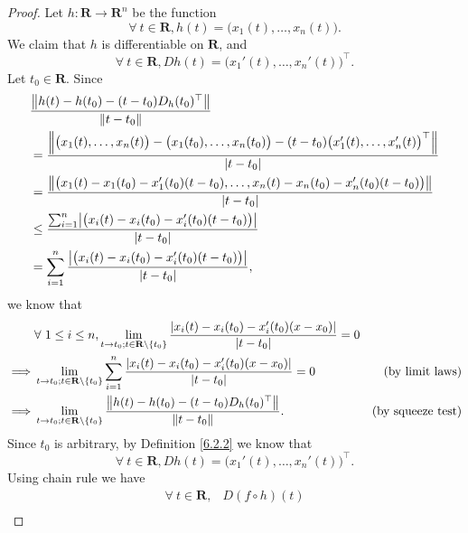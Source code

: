 \begin{proof}
    Let \(h : \mathbf{R} \to \mathbf{R}^n\) be the function
    \[
        \forall\ t \in \mathbf{R}, h(t) = \big(x_1(t), \dots, x_n(t)\big).
    \]
    We claim that \(h\) is differentiable on \(\mathbf{R}\), and
    \[
        \forall\ t \in \mathbf{R}, D h(t) = \big(x_1'(t), \dots, x_n'(t)\big)^\top.
    \]
    Let \(t_0 \in \mathbf{R}\).
    Since
    \begin{align*}
         & \frac{\norm*{h(t) - h(t_0) - (t - t_0) D_h(t_0)^\top}}{\norm*{t - t_0}}                                                                                   \\
         & = \frac{\norm*{\big(x_1(t), \dots, x_n(t)\big) - \big(x_1(t_0), \dots, x_n(t_0)\big) - (t - t_0) \big(x_1'(t), \dots, x_n'(t)\big)^\top}}{\abs*{t - t_0}} \\
         & = \frac{\norm*{\big(x_1(t) - x_1(t_0) - x_1'(t_0)(t - t_0), \dots, x_n(t) - x_n(t_0) - x_n'(t_0)(t - t_0)\big)}}{\abs*{t - t_0}}                          \\
         & \leq \frac{\sum_{i = 1}^n \abs*{\big(x_i(t) - x_i(t_0) - x_i'(t_0)(t - t_0)\big)}}{\abs*{t - t_0}}                                                        \\
         & = \sum_{i = 1}^n \frac{\abs*{\big(x_i(t) - x_i(t_0) - x_i'(t_0)(t - t_0)\big)}}{\abs*{t - t_0}},
    \end{align*}
    we know that
    \begin{align*}
                 & \forall\ 1 \leq i \leq n, \lim_{t \to t_0 ; t \in \mathbf{R} \setminus \{t_0\}} \frac{\abs*{x_i(t) - x_i(t_0) - x_i'(t_0)(x - x_0)}}{\abs*{t - t_0}} = 0                            \\
        \implies & \lim_{t \to t_0 ; t \in \mathbf{R} \setminus \{t_0\}} \sum_{i = 1}^n \frac{\abs*{x_i(t) - x_i(t_0) - x_i'(t_0)(x - x_0)}}{\abs*{t - t_0}} = 0            & \text{(by limit laws)}   \\
        \implies & \lim_{t \to t_0 ; t \in \mathbf{R} \setminus \{t_0\}} \frac{\norm*{h(t) - h(t_0) - (t - t_0) D_h(t_0)^\top}}{\norm*{t - t_0}}.                           & \text{(by squeeze test)}
    \end{align*}
    Since \(t_0\) is arbitrary, by Definition \ref{6.2.2} we know that
    \[
        \forall\ t \in \mathbf{R}, D h(t) = \big(x_1'(t), \dots, x_n'(t)\big)^\top.
    \]
    Using chain rule we have
    \begin{align*}
        \forall\ t \in \mathbf{R}, & D (f \circ h)(t)                                                                                                                           \\

\end{align*}
\end{proof}
